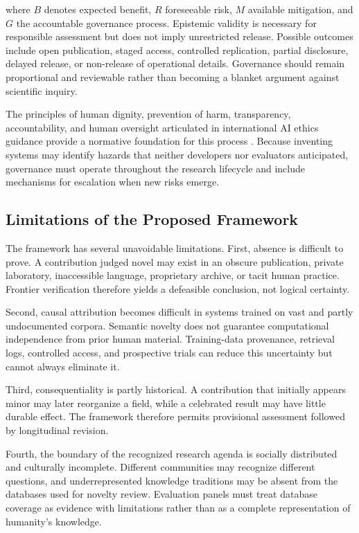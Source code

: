 where $B$ denotes expected benefit, $R$ foreseeable risk, $M$ available
mitigation, and $G$ the accountable governance process. Epistemic validity is
necessary for responsible assessment but does not imply unrestricted release.
Possible outcomes include open publication, staged access, controlled
replication, partial disclosure, delayed release, or non-release of operational
details. Governance should remain proportional and reviewable rather than
becoming a blanket argument against scientific inquiry.

The principles of human dignity, prevention of harm, transparency,
accountability, and human oversight articulated in international AI ethics
guidance provide a normative foundation for this process
\cite{unesco2021recommendation}. Because inventing systems may identify hazards
that neither developers nor evaluators anticipated, governance must operate
throughout the research lifecycle and include mechanisms for escalation when
new risks emerge.

\subsection{\textbf{Limitations of the Proposed Framework}}

The framework has several unavoidable limitations. First, absence is difficult
to prove. A contribution judged novel may exist in an obscure publication,
private laboratory, inaccessible language, proprietary archive, or tacit human
practice. Frontier verification therefore yields a defeasible conclusion, not
logical certainty.

Second, causal attribution becomes difficult in systems trained on vast and
partly undocumented corpora. Semantic novelty does not guarantee computational
independence from prior human material. Training-data provenance, retrieval
logs, controlled access, and prospective trials can reduce this uncertainty but
cannot always eliminate it.

Third, consequentiality is partly historical. A contribution that initially
appears minor may later reorganize a field, while a celebrated result may have
little durable effect. The framework therefore permits provisional assessment
followed by longitudinal revision.

Fourth, the boundary of the recognized research agenda is socially distributed
and culturally incomplete. Different communities may recognize different
questions, and underrepresented knowledge traditions may be absent from the
databases used for novelty review. Evaluation panels must treat database
coverage as evidence with limitations rather than as a complete representation
of humanity's knowledge.

